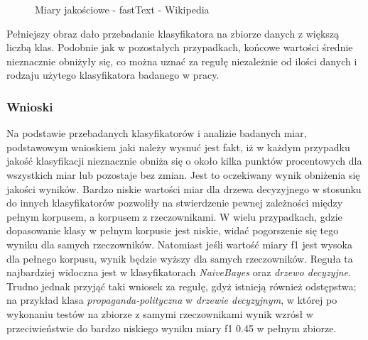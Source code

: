 \begin{figure}[ht!]
	\centering
    \qquad
	\caption{Miary jakościowe - fastText - Wikipedia}
    \label{fig:report-fasttext-wikipedia}
\end{figure}

Pełniejszy obraz dało przebadanie klasyfikatora na zbiorze danych z większą liczbą klas. Podobnie jak w pozostałych przypadkach, końcowe wartości średnie nieznacznie obniżyły się, co można uznać za regułę niezależnie od ilości danych i rodzaju użytego klasyfikatora badanego w pracy.

\subsubsection{Wnioski}
Na podstawie przebadanych klasyfikatorów i analizie badanych miar, podstawowym wnioskiem jaki należy wysnuć jest fakt, iż w każdym przypadku jakość klasyfikacji nieznacznie obniża się o około kilka punktów procentowych dla wszystkich miar lub pozostaje bez zmian. Jest to oczekiwany wynik \cite{walkowiak2018} obniżenia się jakości wyników. 
Bardzo niskie wartości miar dla drzewa decyzyjnego w stosunku do innych klasyfikatorów pozwoliły na stwierdzenie pewnej zależności między pełnym korpusem, a korpusem z rzeczownikami. W wielu przypadkach, gdzie dopasowanie klasy w pełnym korpusie jest niskie, widać pogorszenie się tego wyniku dla samych rzeczowników. Natomiast jeśli wartość miary f1 jest wysoka dla pełnego korpusu, wynik będzie wyższy dla samych rzeczowników. Reguła ta najbardziej widoczna jest w klasyfikatorach \textit{NaiveBayes} oraz \textit{drzewo decyzyjne}. 
Trudno jednak przyjąć taki wniosek za regułę, gdyż istnieją również odstępstwa; na przykład klasa \textit{propaganda-polityczna} w \textit{drzewie decyzyjnym}, w której po wykonaniu testów na zbiorze z samymi rzeczownikami wynik wzrósł w przeciwieństwie do bardzo niskiego wyniku miary f1 0.45 w pełnym zbiorze.

